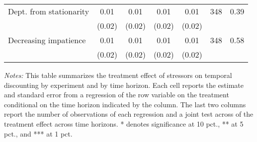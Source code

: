\begin{table}[htbp]
{\begin{threeparttable}
\begin{tabular}{l*{6}{c}}
Dept. from stationarity&     0.01&     0.01&     0.01&     0.01&      348&     0.39\\
          &   (0.02)&   (0.02)&   (0.02)&   (0.02)&         &         \\
Decreasing impatience&     0.01&     0.01&     0.01&     0.01&      348&     0.58\\
          &   (0.02)&   (0.02)&   (0.02)&   (0.02)&         &         \\
\bottomrule \end{tabular} \begin{tablenotes}[flushleft] \footnotesize \item \emph{Notes:} This table summarizes the treatment effect of stressors on temporal discounting by experiment and by time horizon. Each cell reports the estimate and standard error from a regression of the row variable on the treatment conditional on the time horizon indicated by the column. The last two columns report the number of observations of each regression and a joint test across of the treatment effect across time horizons. * denotes significance at 10 pct., ** at 5 pct., and *** at 1 pct. \end{tablenotes} \end{threeparttable} } \end{table}

